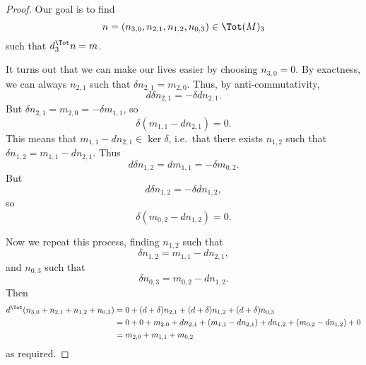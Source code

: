 \documentclass[main.tex]{subfiles}
\begin{document}
\begin{proof}
  Our goal is to find
  \begin{equation*}
    n = (n_{3,0}, n_{2,1}, n_{1,2}, n_{0,3}) \in \Tot(M)_{3}
  \end{equation*}
  such that $d^{\Tot}_{3}n = m$.

  It turns out that we can make our lives easier by choosing $n_{3,0} = 0$. By exactness, we can always $n_{2,1}$ such that $\delta n_{2,1} = m_{2,0}$. Thus, by anti-commutativity,
  \begin{equation*}
    d \delta n_{2,1} = -\delta d n_{2,1}.
  \end{equation*}
  But $\delta n_{2,1} = m_{2,0} = -\delta m_{1,1}$, so
  \begin{equation*}
    \delta(m_{1,1} - d n_{2,1}) = 0.
  \end{equation*}
  This means that $m_{1,1} - dn_{2,1} \in \ker \delta$, i.e.\ that there exists $n_{1,2}$ such that $\delta n_{1,2} = m_{1,1} - dn_{2,1}$. Thus
  \begin{equation*}
    d \delta n_{1,2} = d m_{1,1} = -\delta m_{0,2}.
  \end{equation*}
  But
  \begin{equation*}
    d \delta n_{1,2} = -\delta d n_{1,2},
  \end{equation*}
  so
  \begin{equation*}
    \delta(m_{0,2} - d n_{1,2}) = 0.
  \end{equation*}

  Now we repeat this process, finding $n_{1,2}$ such that
  \begin{equation*}
    \delta n_{1,2} = m_{1,1} - d n_{2,1},
  \end{equation*}
  and $n_{0,3}$ such that
  \begin{equation*}
    \delta n_{0,3} = m_{0,2} - d n_{1,2}.
  \end{equation*}
  Then
  \begin{align*}
    d^{\Tot}(n_{3,0} + n_{2,1} + n_{1,2} + n_{0,3}) &= 0 + (d + \delta) n_{2,1} + (d + \delta)n_{1,2} + (d + \delta) n_{0,3} \\
    &= 0 + 0 + m_{2,0} + d n_{2,1} + (m_{1,1} - dn_{2,1}) + d n_{1,2} + (m_{0,2} - d n_{1,2}) + 0 \\
    &= m_{2,0} + m_{1,1} + m_{0,2}
  \end{align*}
  as required.
\end{proof}
\end{document}
